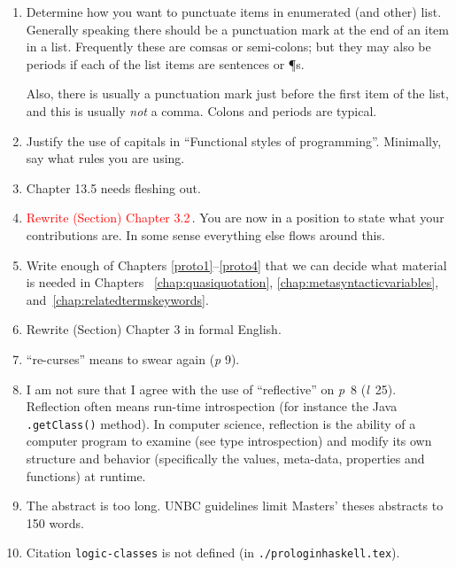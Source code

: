 \begin{scope}
\begin{enumerate}
\item
  Determine how you want to punctuate items in enumerated (and other)
  list.
  Generally speaking there should be a punctuation mark at the end of an
  item in a list.
  Frequently these are comsas or semi-colons; but they may also be
  periods if each of the list items are sentences or \P{}s.

  Also, there is usually a punctuation mark just before the first item
  of the list, and this is usually \textit{not} a comma.  Colons and
  periods are typical.

\item
  Justify the use of capitals in ``Functional styles of programming''.
  Minimally, say what rules you are using.
\item
  Chapter 13.5 needs fleshing out.

\item
  \textcolor{red}{Rewrite (Section) Chapter 3.2}\,.
  You are now in a position to state what your contributions are.
  In some sense everything else flows around this.

\item
  Write enough of Chapters \ref{proto1}--\ref{proto4} that we can decide
  what material is needed in Chapters~ \ref{chap:quasiquotation},
  \ref{chap:metasyntacticvariables},
  and~\ref{chap:relatedtermskeywords}.

\item
  Rewrite (Section) Chapter 3 in formal English.

\item
  ``re-curses'' means to swear again (\textit{p} 9).
\item
  I am not sure that I agree with the use of ``reflective'' on
  \textit{p}~8 (\textit{l}~25).  Reflection often means run-time
  introspection (for instance the Java \Verb!.getClass()! method).
  In computer science, reflection is the ability of a computer program to examine (see type introspection) and modify its own structure and behavior (specifically the values, meta-data, properties and functions) at runtime.
  
\item
  The abstract is too long. UNBC guidelines limit Masters' theses
  abstracts to 150 words.

\item
  Citation \Verb!logic-classes! is not defined (in
  \Verb!./prologinhaskell.tex!). 


\end{enumerate}
\end{scope}
